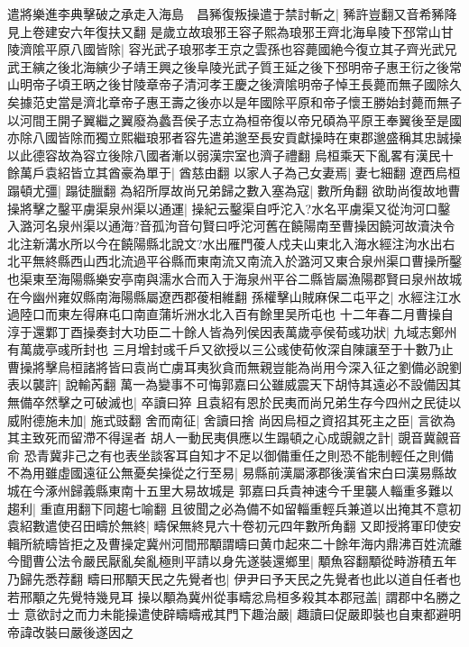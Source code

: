 遣將樂進李典擊破之承走入海島　昌豨復叛操遣于禁討斬之|{
	豨許豈翻又音希豨降見上卷建安六年復扶又翻}
是歲立故琅邪王容子熙為琅邪王齊北海阜陵下邳常山甘陵濟隂平原八國皆除|{
	容光武子琅邪孝王京之雲孫也容薨國絶今復立其子齊光武兄武王縯之後北海縯少子靖王興之後阜陵光武子質王延之後下邳明帝子惠王衍之後常山明帝子頃王昞之後甘陵章帝子清河孝王慶之後濟隂明帝子悼王長薨而無子國除久矣據范史當是濟北章帝子惠王壽之後亦以是年國除平原和帝子懷王勝始封薨而無子以河間王開子翼繼之翼廢為蠡吾侯子志立為桓帝復以帝兄碩為平原王奉翼後至是國亦除八國皆除而獨立熙繼琅邪者容先遣弟邈至長安貢獻操時在東郡邈盛稱其忠誠操以此德容故為容立後除八國者漸以弱漢宗室也濟子禮翻}
烏桓乘天下亂畧有漢民十餘萬戶袁紹皆立其酋豪為單于|{
	酋慈由翻}
以家人子為己女妻焉|{
	妻七細翻}
遼西烏桓蹋頓尤彊|{
	蹋徒臘翻}
為紹所厚故尚兄弟歸之數入塞為寇|{
	數所角翻}
欲助尚復故地曹操將擊之鑿平虜渠泉州渠以通運|{
	操紀云鑿渠自呼沱入?水名平虜渠又從泃河口鑿入潞河名泉州渠以通海?音孤泃音句賢曰呼沱河舊在饒陽南至曹操因饒河故瀆決令北注新溝水所以今在饒陽縣北說文?水出雁門葰人戍夫山東北入海水經注泃水出右北平無終縣西山西北流過平谷縣而東南流又南流入於潞河又東合泉州渠口曹操所鑿也渠東至海陽縣樂安亭南與濡水合而入于海泉州平谷二縣皆屬漁陽郡賢曰泉州故城在今幽州雍奴縣南海陽縣屬遼西郡葰相維翻}
孫權擊山賊麻保二屯平之|{
	水經注江水過陸口而東左得麻屯口南直蒲圻洲水北入百有餘里吴所屯也}
十二年春二月曹操自淳于還鄴丁酉操奏封大功臣二十餘人皆為列侯因表萬歲亭侯荀彧功狀|{
	九域志鄭州有萬歲亭彧所封也}
三月增封彧千戶又欲授以三公彧使荀攸深自陳讓至于十數乃止　曹操將擊烏桓諸將皆曰袁尚亡虜耳夷狄貪而無親豈能為尚用今深入征之劉備必說劉表以襲許|{
	說輸芮翻}
萬一為變事不可悔郭嘉曰公雖威震天下胡恃其遠必不設備因其無備卒然擊之可破滅也|{
	卒讀曰猝}
且袁紹有恩於民夷而尚兄弟生存今四州之民徒以威附德施未加|{
	施式豉翻}
舍而南征|{
	舍讀曰捨}
尚因烏桓之資招其死主之臣|{
	言欲為其主致死而留滯不得逞者}
胡人一動民夷俱應以生蹋頓之心成覬覦之計|{
	覬音冀覦音俞}
恐青冀非己之有也表坐談客耳自知才不足以御備重任之則恐不能制輕任之則備不為用雖虛國遠征公無憂矣操從之行至易|{
	易縣前漢屬涿郡後漢省宋白曰漢易縣故城在今涿州歸義縣東南十五里大易故城是}
郭嘉曰兵貴神速今千里襲人輜重多難以趨利|{
	重直用翻下同趨七喻翻}
且彼聞之必為備不如留輜重輕兵兼道以出掩其不意初袁紹數遣使召田疇於無終|{
	疇保無終見六十卷初元四年數所角翻}
又即授將軍印使安輯所統疇皆拒之及曹操定冀州河間邢顒謂疇曰黄巾起來二十餘年海内鼎沸百姓流離今聞曹公法令嚴民厭亂矣亂極則平請以身先遂裝還鄉里|{
	顒魚容翻顒從畤游積五年乃歸先悉荐翻}
疇曰邢顒天民之先覺者也|{
	伊尹曰予天民之先覺者也此以道自任者也若邢顒之先覺特幾見耳}
操以顒為冀州從事疇忿烏桓多殺其本郡冠盖|{
	謂郡中名勝之士}
意欲討之而力未能操遣使辟疇疇戒其門下趣治嚴|{
	趣讀曰促嚴即裝也自東都避明帝諱改裝曰嚴後遂因之}
